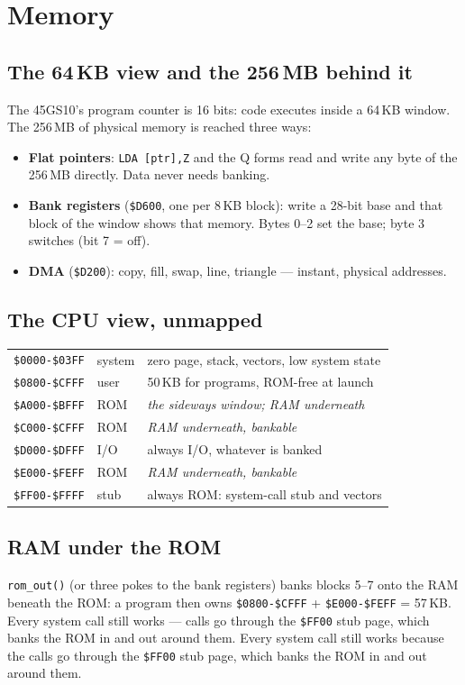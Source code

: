 \chapter{Memory}\label{cha:memory}

\section{The 64\,KB view and the 256\,MB behind it}
The 45GS10's program counter is 16 bits: code executes inside a 64\,KB
window. The 256\,MB of physical memory is reached three ways:
\begin{itemize}[leftmargin=1.4em]
\item \textbf{Flat pointers}: \verb|LDA [ptr],Z| and the Q forms read and
  write any byte of the 256\,MB directly. Data never needs banking.
\item \textbf{Bank registers} (\verb|$D600|, one per 8\,KB block): write a
  28-bit base and that block of the window shows that memory. Bytes 0--2 set
  the base; byte 3 switches (bit 7 = off).
\item \textbf{DMA} (\verb|$D200|): copy, fill, swap, line, triangle ---
  instant, physical addresses.
\end{itemize}

\section{The CPU view, unmapped}
\begin{center}
\begin{tabular}{@{}lll@{}}
\toprule
\texttt{\$0000-\$03FF} & system & zero page, stack, vectors, low system state\\
\texttt{\$0800-\$CFFF} & user   & 50\,KB for programs, ROM-free at launch\\
\texttt{\$A000-\$BFFF} & ROM    & \emph{the sideways window; RAM underneath}\\
\texttt{\$C000-\$CFFF} & ROM    & \emph{RAM underneath, bankable}\\
\texttt{\$D000-\$DFFF} & I/O    & always I/O, whatever is banked\\
\texttt{\$E000-\$FEFF} & ROM    & \emph{RAM underneath, bankable}\\
\texttt{\$FF00-\$FFFF} & stub   & always ROM: system-call stub and vectors\\
\bottomrule
\end{tabular}
\end{center}

\section{RAM under the ROM}
\verb|rom_out()| (or three pokes to the bank registers) banks blocks 5--7
onto the RAM beneath the ROM: a program then owns
\texttt{\$0800-\$CFFF} + \texttt{\$E000-\$FEFF} = 57\,KB. Every system call
still works --- calls go through the \texttt{\$FF00} stub page, which banks
the ROM in and out around them. Every system call still works because the calls go through the
\texttt{\$FF00} stub page, which banks the ROM in and out around them.

